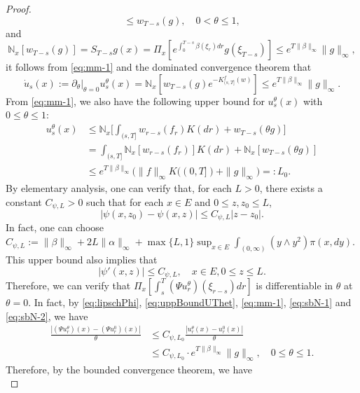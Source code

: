 \documentclass[UTF8]{pkuthss}
\theoremstyle{plain}
\theoremstyle{definition}
\numberwithin{equation}{section}
\begin{document}
\begin{proof}
\begin{equation}
	\leq w_{T-s}(g),
	\quad 0 < \theta \leq 1,
\end{equation}
	and
\begin{equation}
\label{eq:sbN-2}
	\mathbb N_x[w_{T-s}(g)]
	= S_{T-s} g (x)
	= \Pi_x[e^{\int_0^{T-s} \beta(\xi_r) dr} g(\xi_{T-s})]
	\leq e^{T \|\beta\|_\infty} \|g\|_\infty,
\end{equation}
	it follows from \eqref{eq:mm-1} and the dominated convergence theorem that
\begin{equation}
\label{eq:mm-3}
	\dot u_s(x)
	:= \partial_\theta|_{\theta=0} u_s^\theta(x)
	= \mathbb N_x[w_{T-s}(g) e^{-K^f_{(s,T]}(w)}]
	\leq e^{T \|\beta\|_\infty} \|g\|_\infty.
\end{equation}
	From \eqref{eq:mm-1}, we also have the following upper bound for $u_s^\theta (x)$ with $0 \leq \theta \leq 1$:
\begin{align}\label{eq:uppBoundUThet}
	u_s^\theta(x)
	&\leq \mathbb N_x \Big[\int_{(s,T]} w_{r-s}(f_r) K(dr) + w_{T-s}(\theta g)\Big]\\
	&= \int_{(s,T]} \mathbb N_x[w_{r-s}(f_r)] K(dr ) + \mathbb N_x[w_{T-s}(\theta g)]\\
	&\leq e^{T\|\beta\|_\infty} \big( \|f\|_\infty K((0,T])+\|g\|_\infty \big)
	= : L_0.
\end{align}
	By elementary analysis, one can verify that, for each $L>0$, there exists a constant $C_{\psi,L}>0$ such that for each $x\in E$ and $0\leq z, z_0 \leq L$,
\begin{equation}\label{eq:lipschPhi}
	|\psi(x,z_0) - \psi(x,z)|
	\leq C_{\psi,L} |z - z_0|.
\end{equation}
	In fact, one can choose
	$C_{\psi,L} 
	:= \|\beta\|_\infty + 2L\|\alpha\|_\infty + \max\{L,1\} \sup_{x\in E} \int_{(0,\infty)} (y \wedge y^2) \pi(x,dy)$.
	This upper bound also implies that
\[
	|\psi' (x,z)|
	\leq C_{\psi,L},
	\quad x \in E, 0 \leq z \leq L.
\]
	Therefore, we can verify that  
$\Pi_x[\int_s^T (\Psi u^\theta_r)(\xi_{r-s}) dr]$ 
	is differentiable in $\theta$ at $\theta = 0$.
	In fact, by \eqref{eq:lipschPhi}, \eqref{eq:uppBoundUThet}, \eqref{eq:mm-1}, \eqref{eq:sbN-1} and \eqref{eq:sbN-2}, we have
\begin{align}
	\frac {|(\Psi u_r^\theta)(x)- (\Psi u^0_r)(x)|} {\theta}
	&\leq C_{\psi,L_0} \frac {|u_r^\theta(x) - u_r^0(x)|} {\theta}\\
	&\leq C_{\psi,L_0} \cdot e^{T \|\beta\|_\infty} \|g\|_\infty,
	\quad 0 \leq \theta \leq 1.
\end{align}
	Therefore, by the bounded convergence theorem, we have
\begin{equation}

\end{equation}
\end{proof}
\end{document}
